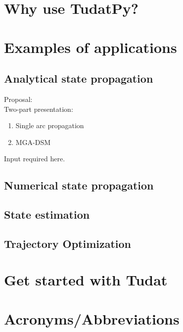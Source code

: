 \documentclass[]{IAC_style_updated}
\begin{document}
\section{Why use TudatPy?}
    

\section{Examples of applications}
    

    \subsection{Analytical state propagation}
    
    Proposal: \\
    Two-part presentation: 
    \begin{enumerate}
        \item Single arc propagation
        \item MGA-DSM
    \end{enumerate}
    \lbrack Input required here.\rbrack

    \subsection{Numerical state propagation}
    

    \subsection{State estimation}
    

    \subsection{Trajectory Optimization}
    
    

\section{Get started with Tudat}
    

\section*{Acronyms/Abbreviations}
    
\end{document}
